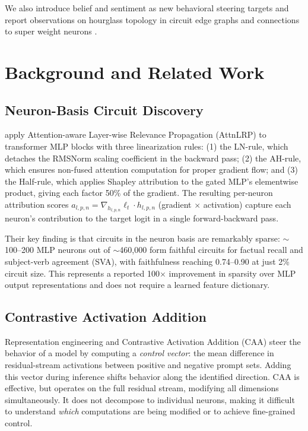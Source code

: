 \documentclass[11pt]{article}
\begin{document}
We also introduce belief and sentiment as new behavioral steering targets and report observations on hourglass topology in circuit edge graphs and connections to super weight neurons \citep{yu2024superweights}.


\section{Background and Related Work}
\label{sec:background}

\subsection{Neuron-Basis Circuit Discovery}
\label{sec:bg_neuron}

\citet{arora2025circuits} apply Attention-aware Layer-wise Relevance Propagation (AttnLRP) \citep{achtibat2024relp} to transformer MLP blocks with three linearization rules: (1) the LN-rule, which detaches the RMSNorm scaling coefficient in the backward pass; (2) the AH-rule, which ensures non-fused attention computation for proper gradient flow; and (3) the Half-rule, which applies Shapley attribution \citep{shapley1953value} to the gated MLP's elementwise product, giving each factor 50\% of the gradient.
The resulting per-neuron attribution scores $a_{l,p,n} = \nabla_{h_{l,p,n}} \ell_t \cdot h_{l,p,n}$ (gradient $\times$ activation) capture each neuron's contribution to the target logit in a single forward-backward pass.

Their key finding is that circuits in the neuron basis are remarkably sparse: ${\sim}$100--200 MLP neurons out of ${\sim}$460,000 form faithful circuits for factual recall and subject-verb agreement (SVA), with faithfulness reaching 0.74--0.90 at just 2\% circuit size.
This represents a reported 100$\times$ improvement in sparsity over MLP output representations and does not require a learned feature dictionary.

\subsection{Contrastive Activation Addition}
\label{sec:bg_caa}

Representation engineering \citep{zou2023representation} and Contrastive Activation Addition (CAA) \citep{rimsky2024steering} steer the behavior of a model by computing a \emph{control vector}: the mean difference in residual-stream activations between positive and negative prompt sets.
Adding this vector during inference shifts behavior along the identified direction.
CAA is effective, but operates on the full residual stream, modifying all dimensions simultaneously.
It does not decompose to individual neurons, making it difficult to understand \emph{which} computations are being modified or to achieve fine-grained control.
\end{document}

